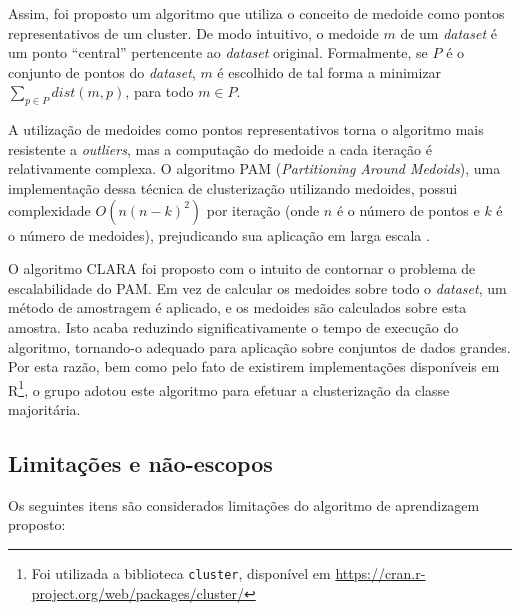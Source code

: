 Assim, foi proposto um algoritmo que utiliza o conceito de medoide como pontos representativos de um cluster. De modo intuitivo, o medoide $m$ de um \textit{dataset} é um ponto ``central'' pertencente ao \textit{dataset} original. Formalmente, se $P$ é o conjunto de pontos do \textit{dataset}, $m$ é escolhido de tal forma a minimizar $\sum_{p \in P}{dist(m,p)}$, para todo $m \in P$.

A utilização de medoides como pontos representativos torna o algoritmo mais resistente a \textit{outliers}, mas a computação do medoide a cada iteração é relativamente complexa. O algoritmo PAM (\textit{Partitioning Around Medoids}), uma implementação dessa técnica de clusterização utilizando medoides, possui complexidade $O\left(n(n-k)^2\right)$ por iteração (onde $n$ é o número de pontos e $k$ é o número de medoides), prejudicando sua aplicação em larga escala \cite{han2005}.

O algoritmo CLARA foi proposto com o intuito de contornar o problema de escalabilidade do PAM. Em vez de calcular os medoides sobre todo o \textit{dataset}, um método de amostragem é aplicado, e os medoides são calculados sobre esta amostra. Isto acaba reduzindo significativamente o tempo de execução do algoritmo, tornando-o adequado para aplicação sobre conjuntos de dados grandes. Por esta razão, bem como pelo fato de existirem implementações disponíveis em R\footnote{Foi utilizada a biblioteca \texttt{cluster}, disponível em \url{https://cran.r-project.org/web/packages/cluster/}}, o grupo adotou este algoritmo para efetuar a clusterização da classe majoritária.

\subsection{Limitações e não-escopos} \label{subsec:limit_aprendizgem}
Os seguintes itens são considerados limitações do algoritmo de aprendizagem proposto:


